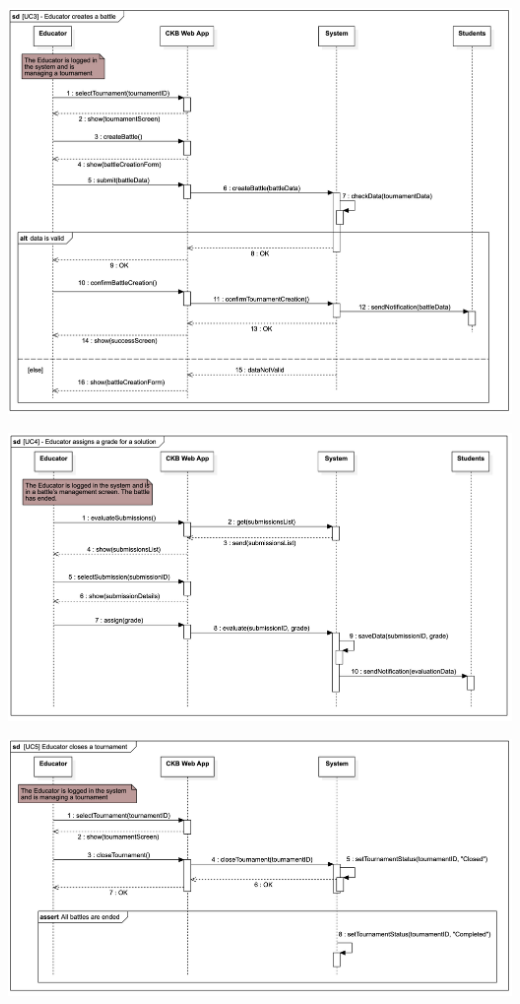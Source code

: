 \documentclass{article}
\begin{document}
\begin{center}
    \includegraphics[width=\linewidth]{image2.png}
  \label{fig:uc3}
\end{center}

\begin{center}
    \includegraphics[width=\linewidth]{image16.png}
  \label{fig:uc4}
\end{center}

\begin{center}
    \includegraphics[width=\linewidth]{image5.png}
  \label{fig:uc5}
\end{center}
\end{document}
